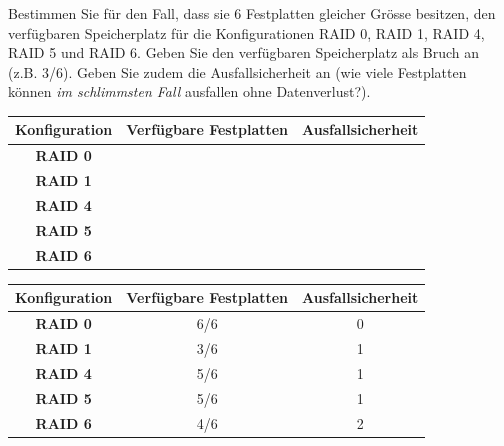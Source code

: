 \begin{myexercise}
	Bestimmen Sie für den Fall, dass sie 6 Festplatten gleicher Grösse besitzen, den verfügbaren Speicherplatz für die Konfigurationen RAID 0, RAID 1, RAID 4, RAID 5 und RAID 6. Geben Sie den verfügbaren Speicherplatz als Bruch an (z.B. 3/6). Geben Sie zudem die Ausfallsicherheit an (wie viele Festplatten können \textit{im schlimmsten Fall} ausfallen ohne Datenverlust?).

	\begin{table}[H]
		\centering
		\begin{tabular}{c||c|c}
			\textbf{Konfiguration} & \textbf{Verfügbare Festplatten} & \textbf{Ausfallsicherheit} \\\midrule\midrule
			\textbf{RAID 0}        &                                 &                            \\[1cm]\midrule
			\textbf{RAID 1}        &                                 &                            \\[1cm]\midrule
			\textbf{RAID 4}        &                                 &                            \\[1cm]\midrule
			\textbf{RAID 5}        &                                 &                            \\[1cm]\midrule
			\textbf{RAID 6}        &                                 &                            \\[1cm]
		\end{tabular}
	\end{table}
	\begin{myanswer}
		\begin{table}[H]
			\centering
			\begin{tabular}{c||c|c}
				\textbf{Konfiguration} & \textbf{Verfügbare Festplatten} & \textbf{Ausfallsicherheit} \\\midrule\midrule
				\textbf{RAID 0}        & 6/6                             & 0                          \\\midrule
				\textbf{RAID 1}        & 3/6                             & 1                          \\\midrule
				\textbf{RAID 4}        & 5/6                             & 1                          \\\midrule
				\textbf{RAID 5}        & 5/6                             & 1                          \\\midrule
				\textbf{RAID 6}        & 4/6                             & 2                          \\
			\end{tabular}
		\end{table}
	\end{myanswer}
\end{myexercise}



